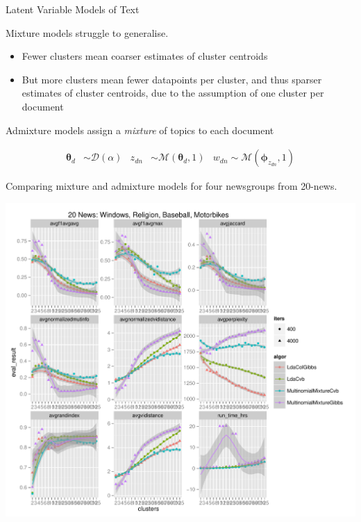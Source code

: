 \documentclass[xcolor=dvipsnames]{beamer}
\newcommand \vv[1] { \boldsymbol #1 }
\newcommand \mul[1]   { \mathcal{M} \left( {#1} \right) }
\newcommand \muln[2]  { \mathcal{M} \left( {#1},{#2} \right) }
\newcommand \dir[1]   { \mathcal{D} \left( {#1} \right) }
\newcommand \dir[1]   { \mathcal{D} \left( {#1} \right) }
\begin{document}
\begin{frame}{Latent Variable Models of Text}
 {
Mixture models struggle to generalise.
\begin{itemize}
    \item Fewer clusters mean coarser estimates of cluster centroids
    \item But more clusters mean fewer datapoints per cluster, and thus sparser estimates of cluster centroids, due to the assumption of one cluster per document
\end{itemize}
}



 {
Admixture models assign a \emph{mixture} of topics to each document\cite{BleiNgJordan2003} 

\begin{align*}
\vv{\theta}_d & \sim \dir{\alpha} & z_{dn} & \sim \muln{\vv{\theta}_d}{1} & w_{dn} \sim \mul{\vv{\phi}_{z_{dn}},1}
\end{align*}

}

 {
    \begin{figure}[t]
    \centering
    \resizebox{6cm}{!}{
        
    }
    \end{figure}
}

 {
    Comparing mixture and admixture models for four newsgroups from 20-news.

    \includegraphics[trim=12.3cm 7.3cm 0.5cm 7.7cm, clip=true]{Images/20news-2013-03-25.pdf}
}


\end{frame}
\end{document}
